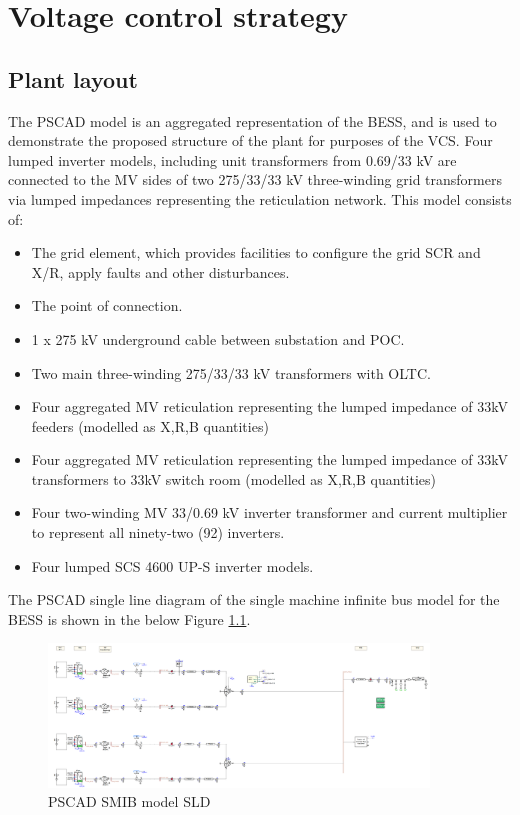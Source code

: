 \documentclass{../grid-link-report}
\begin{document}
	

	\chapter{Voltage control strategy}
	
	\section{Plant layout}
	
	The PSCAD model is an aggregated representation of the BESS, and is used to demonstrate the proposed structure of the plant for purposes of the \ac{VCS}. Four lumped inverter models, including unit transformers from 0.69/33 kV are connected to the MV sides of two  275/33/33 kV three-winding grid transformers via lumped impedances representing the reticulation network. This model consists of:
	
	\begin{itemize}
		\item The grid element, which provides facilities to configure the grid SCR and X/R, apply faults and other disturbances.
		\item The point of connection.
		\item 1 x 275 kV underground cable between substation and \ac{POC}.		
		\item Two main three-winding 275/33/33 kV transformers with \ac{OLTC}.
		\item Four aggregated MV reticulation representing the lumped impedance of 33kV feeders (modelled as X,R,B quantities)	
		\item Four aggregated MV reticulation representing the lumped impedance of 33kV transformers to 33kV switch room (modelled as X,R,B quantities)
		\item Four two-winding MV 33/0.69 kV inverter transformer and current multiplier to represent all ninety-two (92) inverters.
		\item Four lumped SCS 4600 UP-S inverter models. 
	\end{itemize}
	
	The PSCAD single line diagram of the single machine infinite bus model for the BESS is shown in the below Figure \ref{fig:pscad-model-sld}.
	
	\begin{figure}[H]
		\centering
		\includegraphics[width=0.9\textwidth]{report-assets/images/pscad-model-screenshot.png}
		\caption{PSCAD SMIB model SLD}
		\label{fig:pscad-model-sld}
	\end{figure}
	
\end{document}
